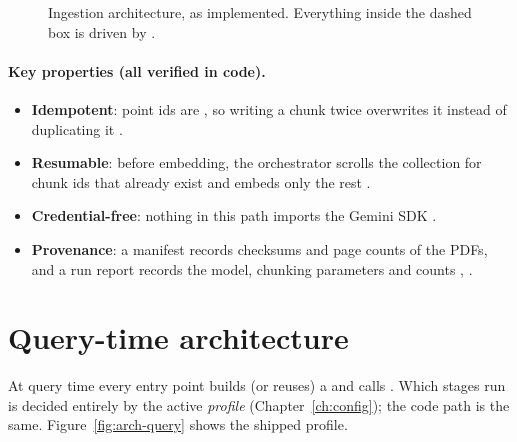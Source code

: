\begin{figure}[htbp]
{}
\caption{Ingestion architecture, as implemented. Everything inside the dashed box is driven by .}
\label{fig:arch-ingest}
\end{figure}

\paragraph{Key properties (all verified in code).}
\begin{itemize}
  \item \textbf{Idempotent}: point ids are , so writing a chunk twice overwrites it instead of duplicating it .
  \item \textbf{Resumable}: before embedding, the orchestrator scrolls the collection for chunk ids that already exist and embeds only the rest .
  \item \textbf{Credential-free}: nothing in this path imports the Gemini SDK .
  \item \textbf{Provenance}: a manifest records checksums and page counts of the PDFs, and a run report records the model, chunking parameters and counts , .
\end{itemize}

\section{Query-time architecture}
\label{sec:arch-query}

At query time every entry point builds (or reuses) a  and calls . Which stages run is decided entirely by the active \emph{profile} (Chapter~\ref{ch:config}); the code path is the same. Figure~\ref{fig:arch-query} shows the shipped  profile.

